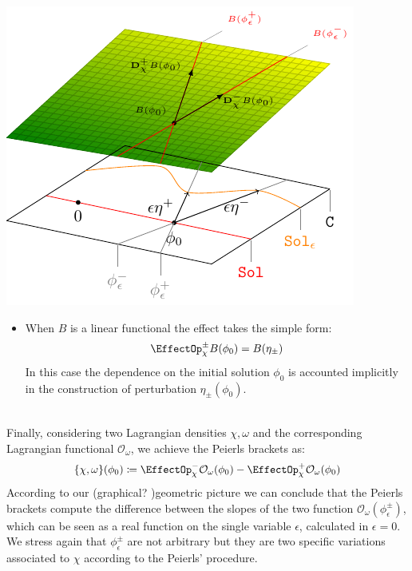 \documentclass[Main]{subfiles}
\begin{document}
		\vspace{1mm}		
		\begin{minipage}{0.5\textwidth}
			\includegraphics[width=\textwidth]{Pictures/GeometricPictureLinear1}
		\end{minipage}
		\begin{minipage}{0.5\textwidth}
			\begin{itemize}
				\item  When $B$ is a linear functional the effect takes the simple form:
					\begin{displaymath}
						\EffectOp_\chi^\pm B (\phi_0) = B ( \eta_\pm)
					\end{displaymath}
					In this case the dependence on the initial solution $\phi_0$ is accounted implicitly in the construction of perturbation $\eta_\pm(\phi_0)$.
			\end{itemize}
		\end{minipage}
		\vspace{1mm}\\	

		Finally, 
		considering two Lagrangian densities $\chi, \omega$ and the corresponding Lagrangian functional $ \mathcal{O}_\omega$, we achieve the Peierls brackets as:
		\begin{displaymath}
			\{\chi, \omega \}(\phi_0) \coloneqq \EffectOp_\chi^- \mathcal{O}_\omega (\phi_0) - \EffectOp_\chi^+ \mathcal{O}_\omega(\phi_0)
		\end{displaymath}
		According to our \ifToninus (\danger graphical? \danger)\fi geometric picture we can conclude that the Peierls brackets compute the difference between the slopes of the two function $\mathcal{O}_\omega ( \phi_\epsilon^\pm)$, which can be seen as a real function on the single variable $\epsilon$, calculated in $\epsilon=0$.
		We stress again that $ \phi_\epsilon^\pm$ are not arbitrary but they are two specific variations associated to $\chi$ according to the Peierls' procedure.
		
\end{document}
